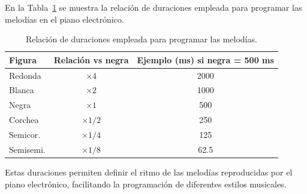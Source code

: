 En la Tabla~\ref{tab:figuras_piano} se muestra la relación de duraciones empleada para programar las melodías en el piano electrónico.

\begin{table}[H]
\centering
\begin{tabular}{|l|c|c|}
\hline
\textbf{Figura} & \textbf{Relación vs negra} & \textbf{Ejemplo (ms) si negra = 500 ms} \\
\hline
Redonda  & $\times 4$   & 2000 \\
Blanca   & $\times 2$   & 1000 \\
Negra    & $\times 1$   & 500 \\
Corchea  & $\times 1/2$ & 250 \\
Semicor. & $\times 1/4$ & 125 \\
Semisemi. & $\times 1/8$ & 62.5 \\
\hline
\end{tabular}
\caption{Relación de duraciones empleada para programar las melodías.}
\label{tab:figuras_piano}
\end{table}

Estas duraciones permiten definir el ritmo de las melodías reproducidas por el piano electrónico, facilitando la programación de diferentes estilos musicales.